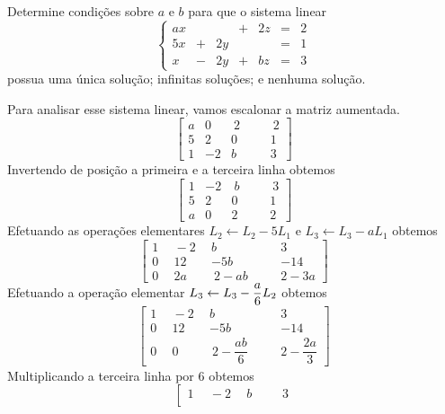 \begin{problem}
Determine condições sobre $a$ e $b$ para que o sistema linear
$$\left\{ \begin{array}{rrrrrrr}  ax &   &    & + & 2z  &  =  &  2 \\
                                  5x & + & 2y &   &     &  =  &  1 \\
                                  x  & - & 2y & + & bz  &  =  &  3 \end{array}\right.$$
possua uma única solução; infinitas soluções; e nenhuma solução.
\end{problem}
\begin{solution}
Para analisar esse sistema linear, vamos escalonar a matriz aumentada.
$$ \left[\begin{array}{rrrr|rr}
  a &    0 &  \ 2 & & &  \ 2  \\
  5 &    2 &    0 & & &    1  \\ 
  1 &   -2 &    b & & &    3  \end{array}\right] $$
Invertendo de posição a primeira e a terceira linha obtemos
$$ \left[\begin{array}{rrrr|rr}
  1 &   -2 &  \ b & & &  \ 3  \\
  5 &    2 &    0 & & &    1  \\ 
	a &    0 &    2 & & &    2  \end{array}\right] $$
Efetuando as operações elementares $L_2 \leftarrow L_2 - 5L_1$ e $L_3 \leftarrow L_3 - aL_1$ obtemos
$$ \left[\begin{array}{rrcr|rc}
  1 &  \ \ -2 \ \  &    b       & & &    3   \\
  0 &  \ \ 12 \ \  &  -5b       & & &  -14   \\ 
	0 &  \ \ 2a \ \  & \  2-ab \  & & &  2-3a  \end{array}\right] $$
Efetuando a operação elementar $\dps L_3 \leftarrow L_3 - \dfrac{a}{6} L_2$ obtemos
$$ \left[\begin{array}{rrcr|rc}
  1 &  \ \  -2 \ \ &    b                  & & &    3              \\[8pt]
  0 &  \ \  12 \ \ &  -5b                  & & &  -14              \\[9pt] 
	0 &  \ \  0  \ \ &  \ 2-\dfrac{ab}{6} \  & & &  2-\dfrac{2a}{3}  \end{array}\right] $$
Multiplicando a terceira linha por $6$ obtemos
$$ \left[\begin{array}{rrcr|rc}
  1 &  \ \  -2 \ \ &    b                & & &    3              \\

\end{array}$$
\end{solution}
